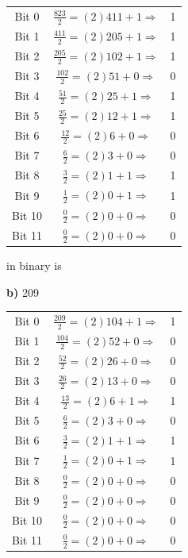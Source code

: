 \documentclass{article}
\begin{document}
    \begin{center}
        \begin{tabular}{ c|c c }
            Bit 0 & $\frac{823}{2} = (2)411 + 1 \Rightarrow$ & 1 \\
            Bit 1 & $\frac{411}{2} = (2)205 + 1 \Rightarrow$ & 1 \\
            Bit 2 & $\frac{205}{2} = (2)102 + 1 \Rightarrow$ & 1 \\
            Bit 3 & $\frac{102}{2} = (2)51 + 0 \Rightarrow$ & 0 \\
            Bit 4 & $\frac{51}{2} = (2)25 + 1 \Rightarrow$ & 1 \\
            Bit 5 & $\frac{25}{2} = (2)12 + 1 \Rightarrow$ & 1 \\
            Bit 6 & $\frac{12}{2} = (2)6 + 0 \Rightarrow$ & 0 \\
            Bit 7 & $\frac{6}{2} = (2)3 + 0 \Rightarrow$ & 0 \\
            Bit 8 & $\frac{3}{2} = (2)1 + 1 \Rightarrow$ & 1 \\
            Bit 9 & $\frac{1}{2} = (2)0 + 1 \Rightarrow$ & 1 \\
            Bit 10 & $\frac{0}{2} = (2)0 + 0 \Rightarrow$ & 0 \\
            Bit 11 & $\frac{0}{2} = (2)0 + 0 \Rightarrow$ & 0
        \end{tabular}
    \end{center}

    \quad{} in binary is 

    \quad \textbf{b)} 209

    \begin{center}
        \begin{tabular}{ c|c c }
            Bit 0 & $\frac{209}{2} = (2)104 + 1 \Rightarrow$ & 1 \\
            Bit 1 & $\frac{104}{2} = (2)52 + 0 \Rightarrow$ & 0 \\
            Bit 2 & $\frac{52}{2} = (2)26 + 0 \Rightarrow$ & 0 \\
            Bit 3 & $\frac{26}{2} = (2)13 + 0 \Rightarrow$ & 0 \\
            Bit 4 & $\frac{13}{2} = (2)6 + 1 \Rightarrow$ & 1 \\
            Bit 5 & $\frac{6}{2} = (2)3 + 0 \Rightarrow$ & 0 \\
            Bit 6 & $\frac{3}{2} = (2)1 + 1 \Rightarrow$ & 1 \\
            Bit 7 & $\frac{1}{2} = (2)0 + 1 \Rightarrow$ & 1 \\
            Bit 8 & $\frac{0}{2} = (2)0 + 0 \Rightarrow$ & 0 \\
            Bit 9 & $\frac{0}{2} = (2)0 + 0 \Rightarrow$ & 0 \\
            Bit 10 & $\frac{0}{2} = (2)0 + 0 \Rightarrow$ & 0 \\
            Bit 11 & $\frac{0}{2} = (2)0 + 0 \Rightarrow$ & 0
        \end{tabular}
    \end{center}
\end{document}
